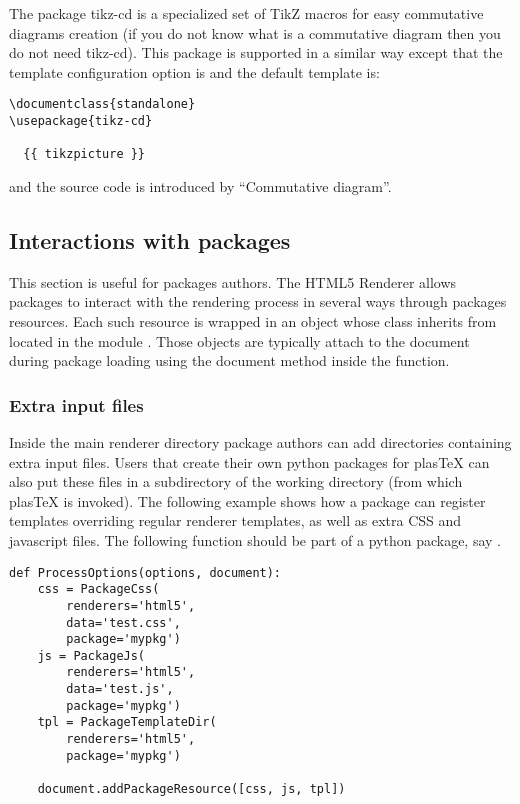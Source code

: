 The package tikz-cd is a specialized set of TikZ macros for easy commutative
diagrams creation (if you do not know what is a commutative diagram then
you do not need tikz-cd). This package is supported in a similar way
except that the template configuration option is
 and the default template is:
\begin{verbatim}
\documentclass{standalone}
\usepackage{tikz-cd}

  {{ tikzpicture }}

\end{verbatim}
and the source code is introduced by ``Commutative diagram''.

\subsection{Interactions with packages}\label{sec:html5-pkg}

This section is useful for packages authors. The HTML5 Renderer allows
packages to interact with the rendering process in several ways through
packages resources. Each such resource is wrapped in an object whose
class inherits from  located in the module
. Those objects are typically attach to
the document during package loading using the document
 method inside the 
function.

\subsubsection*{Extra input files}

Inside the main renderer directory 
package authors can add directories containing extra input files. 
Users that create their own python packages for plasTeX can also put
these files in a subdirectory of the working directory (from which
plasTeX is invoked). The following example shows how a package can
register templates overriding regular renderer templates, as well as
extra CSS and javascript files. The following function should be part of a python package, say .

\begin{verbatim}
def ProcessOptions(options, document):
    css = PackageCss(
        renderers='html5',
        data='test.css',
        package='mypkg')
    js = PackageJs(
        renderers='html5',
        data='test.js',
        package='mypkg')
    tpl = PackageTemplateDir(
        renderers='html5',
        package='mypkg')

    document.addPackageResource([css, js, tpl])
\end{verbatim}

